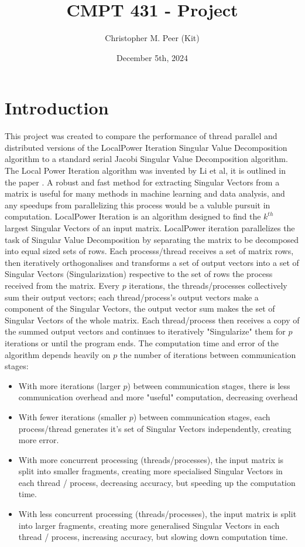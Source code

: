 \documentclass[hidelinks]{article}
\title{\textbf{CMPT 431 - Project}}
\author{Christopher M. Peer (Kit)}
\date{December 5th, 2024}
\begin{document}
\hypersetup{bookmarksnumbered=true,}
\pagecolor{black}
\color{white}
\maketitle

\section{Introduction}
\quad This project was created to compare the performance of thread parallel and distributed versions of the LocalPower Iteration Singular Value Decomposition algorithm to a standard serial Jacobi Singular Value Decomposition algorithm. The Local Power Iteration algorithm was invented by Li et al, it is outlined in the paper \cite{li2021communicationefficientdistributedsvdlocal}. A robust and fast method for extracting Singular Vectors from a matrix is useful for many methods in machine learning and data analysis, and any speedups from parallelizing this process would be a valuble pursuit in computation.
\newline
\quad LocalPower Iteration is an algorithm designed to find the $k^{th}$ largest Singular Vectors of an input matrix. LocalPower iteration parallelizes the task of Singular Value Decomposition by separating the matrix to be decomposed into equal sized sets of rows. Each processs/thread receives a set of matrix rows, then iteratively orthogonalises and transforms a set of output vectors into a set of Singular Vectors (Singularization) respective to the set of rows the process received from the matrix. Every $p$ iterations, the threads/processes collectively sum their output vectors; each thread/process's output vectors make a component of the Singular Vectors, the output vector sum makes the set of Singular Vectors of the whole matrix. Each thread/process then receives a copy of the summed output vectors and continues to iteratively "Singularize" them for $p$ iterations or until the program ends.
\newline 
\quad The computation time and error of the algorithm depends heavily on $p$ the number of iterations between communication stages: 
\begin{itemize} 
    \item With more iterations (larger $p$) between communication stages, there is less communication overhead and more "useful" computation, decreasing overhead
    \item With fewer iterations (smaller $p$) between communication stages, each process/thread generates it's set of Singular Vectors independently, creating more error.
    \item With more concurrent processing (threads/processes), the input matrix is split into smaller fragments, creating more specialised Singular Vectors in each thread / process, decreasing accuracy, but speeding up the computation time.
    \item With less concurrent processing (threads/processes), the input matrix is split into larger fragments, creating more generalised Singular Vectors in each thread / process, increasing accuracy, but slowing down computation time.
\end{itemize}
\end{document}
